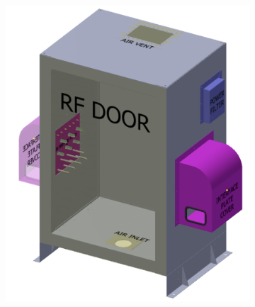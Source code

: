 \begin{figure}
    \centering
    \centering
    \begin{subfigure}{.45\textwidth}
        \centering
        \includegraphics[width=\linewidth]{backend_diag}
    \end{subfigure}
    \hfill
    \begin{subfigure}{.4\textwidth}
    \centering

\end{subfigure}
\end{figure}
